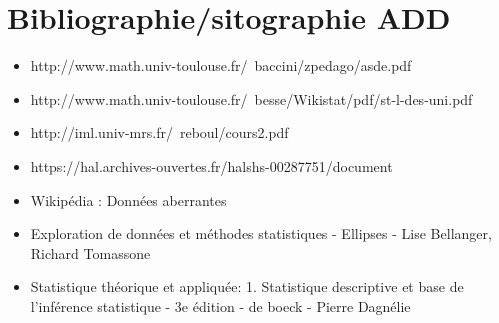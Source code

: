 	\section{Bibliographie/sitographie ADD}
	\begin{frame}
	\begin{itemize}
		\item http://www.math.univ-toulouse.fr/~baccini/zpedago/asde.pdf
		\item http://www.math.univ-toulouse.fr/~besse/Wikistat/pdf/st-l-des-uni.pdf
		\item http://iml.univ-mrs.fr/~reboul/cours2.pdf
		\item https://hal.archives-ouvertes.fr/halshs-00287751/document
		\item Wikipédia : Données aberrantes
		\item Exploration de données et méthodes statistiques - Ellipses - Lise Bellanger, Richard Tomassone
		\item Statistique théorique et appliquée: 1. Statistique descriptive et base de l'inférence statistique - 3e édition - de boeck - Pierre Dagnélie
	\end{itemize}
		
	\end{frame}
	

